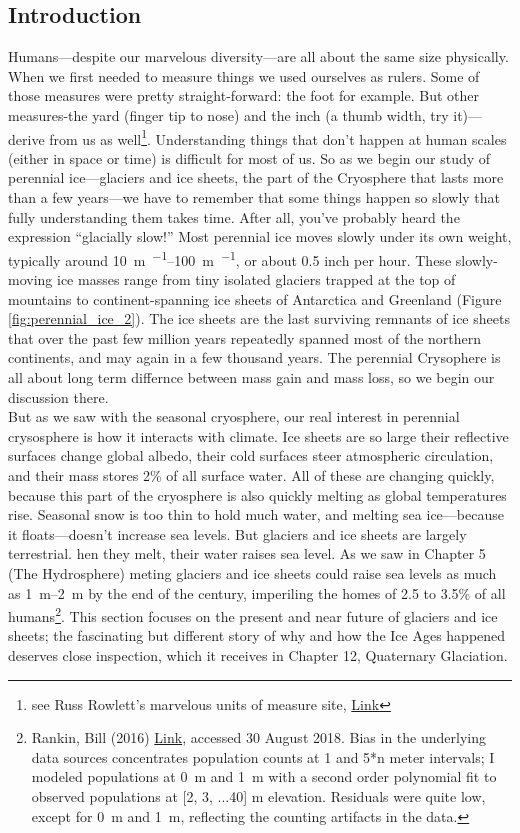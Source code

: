 \subsection{Introduction}
Humans---despite our marvelous diversity---are all about the same size physically. When we first needed to measure things we used ourselves as rulers. Some of those measures were pretty straight-forward: the foot for example. But other measures-the yard (finger tip to nose) and the inch (a thumb width, try it)---derive from us as well\footnote{see Russ Rowlett's marvelous units of measure site, \href{http://www.ibiblio.org/units/custom.html}{Link}}. Understanding things that don't happen at human scales (either in space or time) is difficult for most of us. So as we begin our study of perennial ice---glaciers and ice sheets, the part of the Cryosphere that lasts more than a few years---we have to remember that some things happen so slowly that fully understanding them takes time. After all, you've probably heard the expression ``glacially slow!'' Most perennial ice moves slowly under its own weight, typically around \SIrange{10}{100}{\metre\per\year}, or about 0.5 inch per hour. These slowly-moving ice masses range from tiny isolated glaciers trapped at the top of mountains to continent-spanning ice sheets of Antarctica and Greenland (Figure \ref{fig:perennial_ice_2}). The ice sheets are the last surviving remnants of ice sheets that over the past few million years repeatedly spanned most of the northern continents, and may again in a few thousand years. The perennial Crysophere is all about long term differnce between mass gain and mass loss, so we begin our discussion there.  \\

But as we saw with the seasonal cryosphere, our real interest in perennial crysosphere is how it interacts with climate. Ice sheets are so large their reflective surfaces change global albedo, their cold surfaces steer atmospheric circulation, and their mass stores 2\% of all surface water. All of these are changing quickly, because this part of the cryosphere is also quickly melting as global temperatures rise. Seasonal snow is too thin to hold much water, and melting sea ice---because it floats---doesn't increase sea levels. But glaciers and ice sheets are largely terrestrial. hen they melt, their water raises sea level. As we saw in Chapter 5 (The Hydrosphere) meting glaciers and ice sheets could raise sea levels as much as \SIrange{1}{2}{\metre} by the end of the century, imperiling the homes of 2.5 to 3.5\% of all humans\footnote{ Rankin, Bill (2016) \href{http://www.radicalcartography.net/index.html?howhigh}{Link}, accessed 30 August 2018. Bias in the underlying data sources concentrates population counts at 1 and 5*n meter intervals; I modeled populations at \SI{0}{\metre} and \SI{1}{\metre} with a second order polynomial fit to observed populations at [2, 3, ...40] m elevation. Residuals were quite low, except for \SI{0}{\metre} and \SI{1}{\metre}, reflecting the counting artifacts in the data.}. This section focuses on the present and near future of glaciers and ice sheets; the fascinating but different story of why and how the Ice Ages happened deserves close inspection, which it receives in Chapter 12, Quaternary Glaciation.  
 
